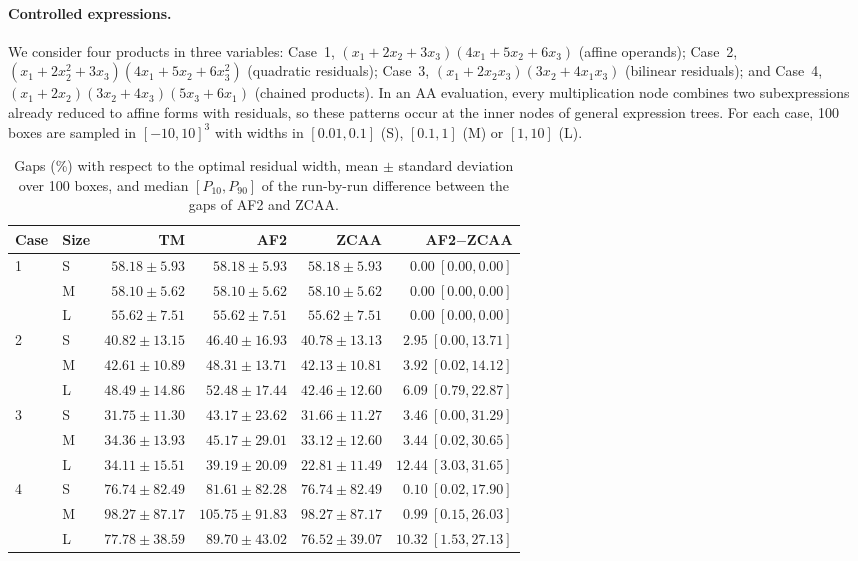 \documentclass[10pt]{article}
\begin{document}
\paragraph{Controlled expressions.} We consider four products in three variables: Case~1, $(x_1+2x_2+3x_3)(4x_1+5x_2+6x_3)$ (affine operands); Case~2, $(x_1+2x_2^2+3x_3)(4x_1+5x_2+6x_3^2)$ (quadratic residuals); Case~3, $(x_1+2x_2x_3)(3x_2+4x_1x_3)$ (bilinear residuals); and Case~4, $(x_1+2x_2)(3x_2+4x_3)(5x_3+6x_1)$ (chained products). In an AA evaluation, every multiplication node combines two subexpressions already reduced to affine forms with residuals, so these patterns occur at the inner nodes of general expression trees. For each case, 100 boxes are sampled in $[-10,10]^3$ with widths in $[0.01,0.1]$ (S), $[0.1,1]$ (M) or $[1,10]$ (L).

\begin{table}[t]
\centering
\caption{Gaps (\%) with respect to the optimal residual width, mean $\pm$ standard deviation over 100 boxes, and median $[P_{10},P_{90}]$ of the run-by-run difference between the gaps of AF2 and ZCAA.}
\label{tab:controlled}
\small
\setlength{\tabcolsep}{3.5pt}
\begin{tabular}{llrrrr}
\toprule
Case & Size & TM & AF2 & ZCAA & AF2$-$ZCAA \\
\midrule
1 & S & $58.18 \pm 5.93$ & $58.18 \pm 5.93$ & $58.18 \pm 5.93$ & $0.00\ [0.00, 0.00]$ \\
  & M & $58.10 \pm 5.62$ & $58.10 \pm 5.62$ & $58.10 \pm 5.62$ & $0.00\ [0.00, 0.00]$ \\
  & L & $55.62 \pm 7.51$ & $55.62 \pm 7.51$ & $55.62 \pm 7.51$ & $0.00\ [0.00, 0.00]$ \\
\midrule
2 & S & $40.82 \pm 13.15$ & $46.40 \pm 16.93$ & $40.78 \pm 13.13$ & $2.95\ [0.00, 13.71]$ \\
  & M & $42.61 \pm 10.89$ & $48.31 \pm 13.71$ & $42.13 \pm 10.81$ & $3.92\ [0.02, 14.12]$ \\
  & L & $48.49 \pm 14.86$ & $52.48 \pm 17.44$ & $42.46 \pm 12.60$ & $6.09\ [0.79, 22.87]$ \\
\midrule
3 & S & $31.75 \pm 11.30$ & $43.17 \pm 23.62$ & $31.66 \pm 11.27$ & $3.46\ [0.00, 31.29]$ \\
  & M & $34.36 \pm 13.93$ & $45.17 \pm 29.01$ & $33.12 \pm 12.60$ & $3.44\ [0.02, 30.65]$ \\
  & L & $34.11 \pm 15.51$ & $39.19 \pm 20.09$ & $22.81 \pm 11.49$ & $12.44\ [3.03, 31.65]$ \\
\midrule
4 & S & $76.74 \pm 82.49$ & $81.61 \pm 82.28$ & $76.74 \pm 82.49$ & $0.10\ [0.02, 17.90]$ \\
  & M & $98.27 \pm 87.17$ & $105.75 \pm 91.83$ & $98.27 \pm 87.17$ & $0.99\ [0.15, 26.03]$ \\
  & L & $77.78 \pm 38.59$ & $89.70 \pm 43.02$ & $76.52 \pm 39.07$ & $10.32\ [1.53, 27.13]$ \\
\bottomrule
\end{tabular}
\end{table}
\end{document}
